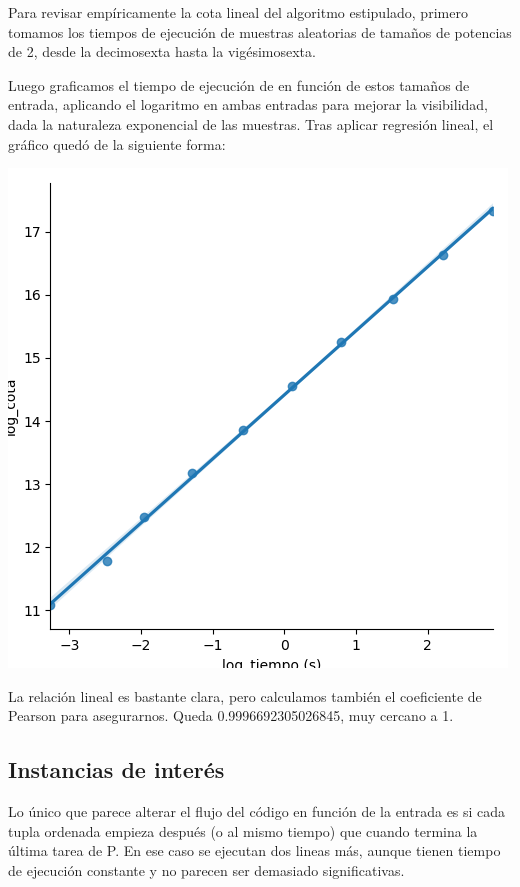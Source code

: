 \vspace{0.5em}
Para revisar empíricamente la cota lineal del algoritmo estipulado, primero tomamos los tiempos de ejecución de muestras aleatorias de tamaños de potencias de 2, desde la decimosexta hasta la vigésimosexta.

Luego graficamos el tiempo de ejecución de en función de estos tamaños de entrada, aplicando el logaritmo en ambas entradas para mejorar la visibilidad, dada la naturaleza exponencial de las muestras. Tras aplicar regresión lineal, el gráfico quedó de la siguiente forma:

\includegraphics{packages/Grafico_aleatorios.png}

La relación lineal es bastante clara, pero calculamos también el coeficiente de Pearson para asegurarnos. Queda 0.9996692305026845, muy cercano a 1.

\vspace{0.5em}
\subsection{Instancias de interés}

Lo único que parece alterar el flujo del código en función de la entrada es si cada tupla ordenada empieza después (o al mismo tiempo) que cuando termina la última tarea de P. En ese caso se ejecutan dos lineas más, aunque tienen tiempo de ejecución constante y no parecen ser demasiado significativas.

